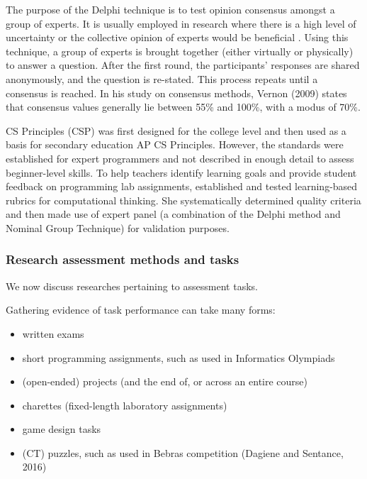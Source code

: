 The purpose of the Delphi technique is to test opinion consensus amongst a group of experts. It is usually employed in research where there is a high level of uncertainty or the collective opinion of experts would be beneficial \cite{kallia2017assessment}. Using this technique, a group of experts is brought together (either virtually or physically) to answer a question. After the first round, the participants' responses are shared anonymously, and the question is re-stated. This process repeats until a consensus is reached. In his study on consensus methods, Vernon (2009) states that consensus values generally lie between 55\% and 100\%, with a modus of 70\%.




CS Principles (CSP) was first designed for the college level and then used as a basis for secondary education AP CS Principles. However, the standards were established for expert programmers and not described in enough detail to assess beginner-level skills. To help teachers identify learning goals and provide student feedback on programming lab assignments,  established and tested learning-based rubrics for computational thinking. She systematically determined quality criteria and then made use of expert panel (a combination of the Delphi method and Nominal Group Technique) for validation purposes.






\subsubsection{Research assessment methods and tasks}
We now discuss researches pertaining to assessment tasks.


Gathering evidence of task performance can take many forms:
\begin{itemize}
\item written exams
\item short programming assignments, such as used in Informatics Olympiads \cite{Lonati2017Bebras}
\item (open-ended) projects (and the end of, or across an entire course)
\item charettes (fixed-length laboratory assignments)
\item game design tasks \cite{snow2017CTECD}
\item (CT) puzzles, such as used in Bebras competition (Dagiene and Sentance, 2016)

\end{itemize}


